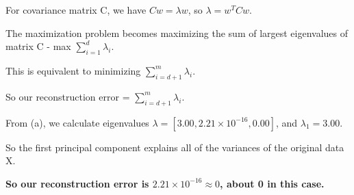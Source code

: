 \documentclass{article}
\begin{document}
\medskip
For covariance matrix C, we have $Cw = \lambda w $, so $\lambda = w^T Cw$.

\medskip
The maximization problem becomes maximizing the sum of largest eigenvalues of matrix C - max $\sum_{i=1}^d \lambda_i$.

This is equivalent to minimizing $\sum_{i=d+1}^m \lambda_i$. 

So our reconstruction error = $\sum_{i=d+1}^m \lambda_i$.

\medskip
From (a), we calculate eigenvalues $\lambda = [3.00, 2.21\times10^{-16}, 0.00]$, and $\lambda_1 = 3.00$.

So the first principal component explains all of the variances of the original data X.

\textbf{So our reconstruction error is $2.21\times10^{-16} \approx 0$, about 0 in this case.}

\subsection{}

\begin{centering}
\begin{figure}[h]%
    \centering
    \qquad
\end{figure}
\end{centering}
\end{document}
